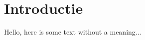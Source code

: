 \documentclass[../DCM2_Verslag.tex]{subfiles}
\begin{document}
\section{Introductie}



Hello, here is some text without a meaning...
\end{document}
